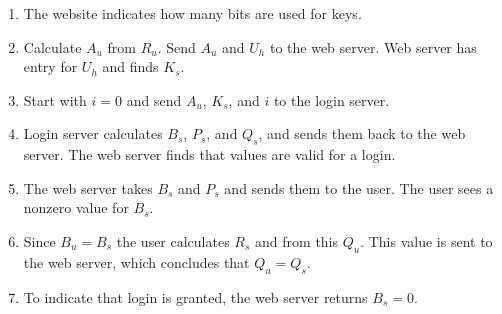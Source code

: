 \begin{enumerate}
\item	The website indicates how many bits are used for keys.
\item	Calculate $A_u$ from $R_u$.
		Send $A_u$ and $U_h$ to the web server.
		Web server has entry for $U_h$ and finds $K_s$.
\item	Start with $i=0$ and send $A_u$, $K_s$, and $i$ to the login server.
\item	Login server calculates $B_s$, $P_s$, and $Q_s$,
		and sends them back to the web server.
		The web server finds that values are valid for a login.
\item	The web server takes $B_s$ and $P_s$ and sends them to the user.
		The user sees a nonzero value for $B_s$.
\item	Since $B_u=B_s$ the user calculates $R_s$ and from this $Q_u$.
		This value is sent to the web server, which concludes that $Q_u=Q_s$.
\item	To indicate that login is granted, the web server returns $B_s=0$.
\end{enumerate}
